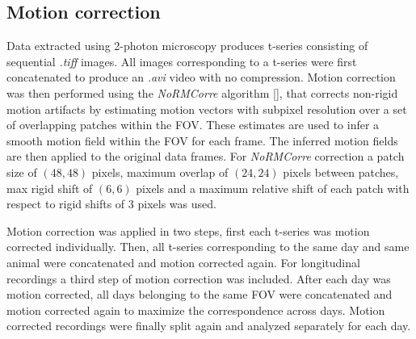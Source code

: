 \subsection{Motion correction}
Data extracted using 2-photon microscopy produces t-series consisting of sequential \textit{.tiff} images. 
All images corresponding to a t-series were first concatenated to produce an \textit{.avi} video with no compression.
Motion correction was then performed using the \textit{NoRMCorre} algorithm [\cite{pnevmatikakis2017}], that corrects non-rigid motion artifacts by estimating motion vectors with subpixel resolution over a set of overlapping patches within the FOV. 
These estimates are used to infer a smooth motion field within the FOV for each frame. 
The inferred motion fields are then applied to the original data frames.
For \textit{NoRMCorre} correction a patch size of $(48,48)$ pixels, maximum overlap of $(24,24)$ pixels between patches, max rigid shift of $(6,6)$ pixels and a maximum relative shift of each patch with respect to rigid shifts of 3 pixels was used.  

Motion correction was applied in two steps, first each t-series was motion corrected individually.
Then, all t-series corresponding to the same day and same animal were concatenated and motion corrected again.
For longitudinal recordings a third step of motion correction was included.
After each day was motion corrected, all days belonging to the same FOV were concatenated and motion corrected again to maximize the correspondence across days. 
Motion corrected recordings were finally split again and analyzed separately for each day.
